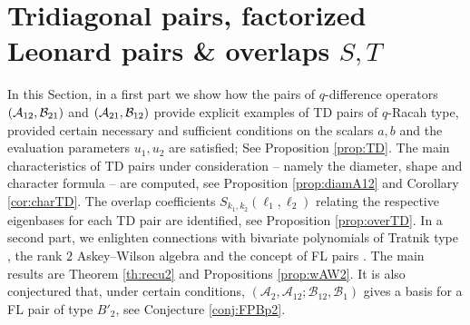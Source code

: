 \documentclass[11pt]{amsart}
\numberwithin{equation}{section}
\numberwithin{equation}{section}
\begin{document}
\section{Tridiagonal pairs, factorized Leonard pairs \& overlaps $S,T$} \label{sec:TDFLP}
In this Section, in a first part we show how the pairs of $q$-difference operators $({\cal A}_{12},{\cal B}_{21})$ and $({\cal A}_{21},{\cal B}_{12})$ provide explicit examples of TD pairs of $q$-Racah type, provided certain necessary and sufficient conditions on the scalars $a,b$ and the evaluation parameters $u_1,u_2$ are satisfied; See Proposition \ref{prop:TD}. The main characteristics of TD pairs under consideration -- namely the diameter, shape and character formula -- are computed, see Proposition \ref{prop:diamA12} and Corollary \ref{cor:charTD}. The overlap coefficients ${S}_{k_1,k_2}(\ell_1,\ell_2)$ relating the respective eigenbases for each TD pair are identified, see Proposition \ref{prop:overTD}. 
In a second part, we enlighten  connections  with bivariate polynomials of Tratnik type \cite{T91a,T91b,GR05,I08}, the rank $2$ Askey--Wilson algebra \cite{PW17,DD18,GW22,CF23} and the concept of FL pairs \cite{CZ23}. The main results are Theorem \ref{th:recu2} and Propositions \ref{prop:wAW2}.  It is also conjectured that, under certain conditions,  $(\mathcal{A}_2,\mathcal{A}_{12};\mathcal{B}_{12},\mathcal{B}_1)$ gives a basis for a FL pair of type $B'_2$,
see  Conjecture \ref{conj:FPBp2}.
\end{document}
